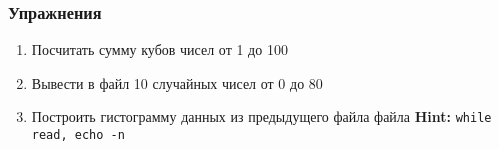\begin{frame}[fragile]
    \frametitle{Упражнения}
    \begin{enumerate}
        \item Посчитать сумму кубов чисел от 1 до 100
        \item Вывести в файл 10 случайных чисел от 0 до 80
        \item Построить гистограмму данных из предыдущего файла файла {\bf Hint:} {\tt while read, echo -n }
    \end{enumerate}
\end{frame}
